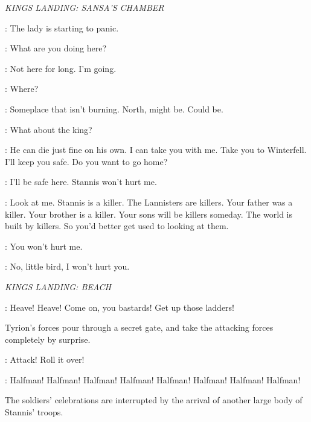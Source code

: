 \scene

\textit{KINGS LANDING: SANSA'S CHAMBER}


\HOUND: The lady is starting to panic. 

\SANSA:  What are you doing here? 

\HOUND: Not here for long. I'm going. 

\SANSA: Where? 

\HOUND: Someplace that isn't burning. North, might be. Could be. 

\SANSA: What about the king? 

\HOUND: He can die just fine on his own. I can take you with me. Take you to Winterfell. I'll keep you safe. Do you want to go home? 

\SANSA: I'll be safe here. Stannis won't hurt me. 

\HOUND: Look at me. Stannis is a killer. The Lannisters are killers. Your father was a killer. Your brother is a killer. Your sons will be killers someday. The world is built by killers. So you'd better get used to looking at them. 

\SANSA: You won't hurt me. 

\HOUND: No, little bird, I won't hurt you. 


\scene

\textit{KINGS LANDING: BEACH}


\CAPTAIN: Heave! Heave! Come on, you bastards! Get up those ladders! 


\n Tyrion's forces pour through a secret gate, and take the attacking forces completely by surprise.


\TYRION: Attack! Roll it over! 

\CROWD: Halfman! Halfman! Halfman! Halfman! Halfman! Halfman! Halfman! Halfman! 

\n The soldiers' celebrations are interrupted by the arrival of another large body of Stannis' troops.


